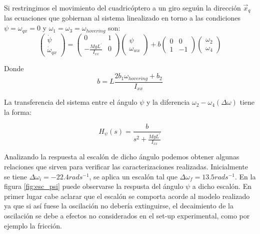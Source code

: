 \documentclass[main]{subfiles}
\begin{document}
Si restringimos el movimiento del cuadric\'optero a un giro segu\'un la direcci\'on $\vec{x}_q$ las ecuaciones que gobiernan al sistema linealizado en torno a las condiciones $\psi = \omega_{qx} = 0$ y $\omega_1 = \omega_3 =\omega_{hovering}$ son:
\begin{equation}
\label{eq:mod_psi}
\left(\begin{array}{c}
\dot{\psi}\\
\dot{\omega}_{qx}
\end{array}\right) = \left(\begin{array}{cc}
0 & 1\\
-\frac{MgL^\prime}{I_{xx}} & 0
\end{array}\right)\left(\begin{array}{c}
\psi\\
\omega_{wx}
\end{array}\right) + b\left(\begin{array}{cc}
0 & 0\\
1 & -1
\end{array}\right)\left(\begin{array}{c}
\omega_2\\
\omega_4
\end{array}\right)
\end{equation}

Donde
\begin{equation}
b =L\frac{2b_1\omega_{hovering}+b_2}{I_{xx}}
\end{equation}

La transferencia del sistema entre el \'angulo $\psi$ y la diferencia $\omega_2-\omega_4 (\Delta \omega)$ tiene la forma:

\begin{equation}
\label{eq:trans_psi}
H_{\psi}(s) = \frac{b}{s^2+\frac{MgL^\prime}{I_{xx}}}
\end{equation}

Analizando la respuesta al escal\'on de dicho \'angulo podemos obtener algunas relaciones que sirven para verificar las caracterizaciones realizadas. Inicialmente se tiene $\Delta \omega_i = -22.4 rad s^{-1}$, se aplica un escal\'on tal que $\Delta \omega_f = 13.5 rad s^{-1}$. En la figura \ref{fig:esc_psi} puede observarse la respusta del \'angulo $\psi$ a dicho escal\'on. En primer lugar cabe aclarar que el escal\'on se comporta acorde al modelo realizado ya que si as\'i fuese la oscilaci\'on no deber\'ia extinguirse, el decaimiento de la oscilaci\'on se debe a efectos no considerados en el set-up experimental, como por ejemplo la fricci\'on.\\
\end{document}
